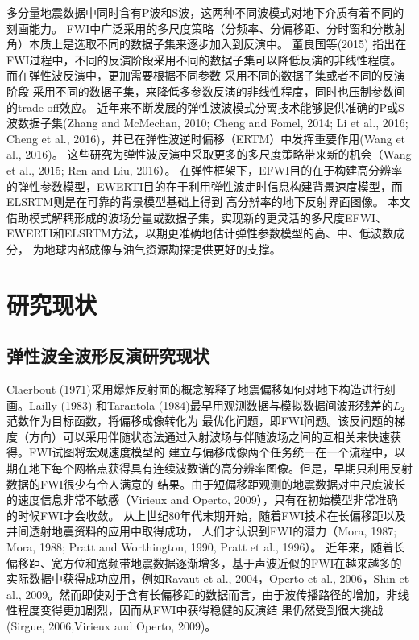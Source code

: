 多分量地震数据中同时含有P波和S波，这两种不同波模式对地下介质有着不同的刻画能力。
FWI中广泛采用的多尺度策略（分频率、分偏移距、分时窗和分散射角）本质上是选取不同的数据子集来逐步加入到反演中。
董良国等(2015)\cite{董良国2015}
指出在FWI过程中，不同的反演阶段采用不同的数据子集可以降低反演的非线性程度。而在弹性波反演中，更加需要根据不同参数
采用不同的数据子集或者不同的反演阶段
采用不同的数据子集，来降低多参数反演的非线性程度，同时也压制参数间的trade-off效应。
近年来不断发展的弹性波波模式分离技术能够提供准确的P或S波数据子集(Zhang and McMechan,
2010\cite{zhang.mcmechan:2010}; Cheng and Fomel,
2014\cite{cheng:2014b}; Li et al., 2016\cite{Li2016a}; Cheng et al.,
2016\cite{cheng:2016})，并已在弹性波逆时偏移（ERTM）中发挥重要作用(Wang et al.,
2016\cite{wang2016scalar})。
这些研究为弹性波反演中采取更多的多尺度策略带来新的机会（Wang et al., 2015\cite{wang:2015}; Ren and
Liu, 2016\cite{ren.liu:2016}）。
在弹性框架下，EFWI目的在于构建高分辨率的弹性参数模型，EWERTI目的在于利用弹性波走时信息构建背景速度模型，而ELSRTM则是在可靠的背景模型基础上得到
高分辨率的地下反射界面图像。
本文借助模式解耦形成的波场分量或数据子集，实现新的更灵活的多尺度EFWI、EWERTI和ELSRTM方法，以期更准确地估计弹性参数模型的高、中、低波数成分，
为地球内部成像与油气资源勘探提供更好的支撑。

\section{研究现状}
\subsection{弹性波全波形反演研究现状}
Claerbout
(1971\cite{Claerbout1971})采用爆炸反射面的概念解释了地震偏移如何对地下构造进行刻画。Lailly
(1983)\cite{lailly1983seismic}
和Tarantola (1984)\cite{tarantola1984}最早用观测数据与模拟数据间波形残差的$L_2$范数作为目标函数，将偏移成像转化为
最优化问题，即FWI问题。该反问题的梯度（方向）可以采用伴随状态法通过入射波场与伴随波场之间的互相关来快速获得。FWI试图将宏观速度模型的
建立与偏移成像两个任务统一在一个流程中，以期在地下每个网格点获得具有连续波数谱的高分辨率图像。但是，早期只利用反射数据的FWI很少有令人满意的
结果。由于短偏移距观测的地震数据对中尺度波长的速度信息非常不敏感（Virieux and Operto,
2009\cite{virieux2009overview}），只有在初始模型非常准确
的时候FWI才会收敛。
从上世纪80年代末期开始，随着FWI技术在长偏移距以及井间透射地震资料的应用中取得成功，
人们才认识到FWI的潜力（Mora, 1987\cite{mora:1987}; Mora, 1988\cite{mora1988elastic}; Pratt
and Worthington, 1990\cite{PRATTEtAl1990}, Pratt et al., 1996\cite{pratt1996two}）。
近年来，随着长偏移距、宽方位和宽频带地震数据逐渐增多，基于声波近似的FWI在越来越多的实际数据中获得成功应用，例如Ravaut
et al., 2004\cite{RavautEtAl2004}，Operto et al., 2006\cite{Operto2006}，Shin et al.,
2009\cite{ShinEtAl2009}。然而即使对于含有长偏移距的数据而言，由于波传播路径的增加，非线性程度变得更加剧烈，因而从FWI中获得稳健的反演结
果仍然受到很大挑战(Sirgue, 2006\cite{sirgue2006importance},Virieux and Operto,
2009\cite{virieux2009overview})。

